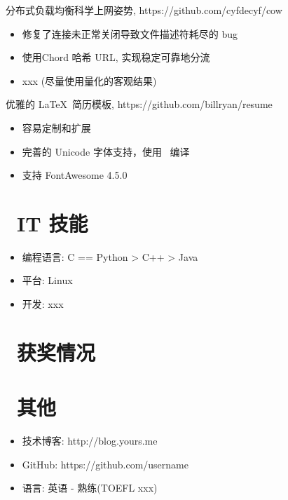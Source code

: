 \documentclass{resume}
\begin{document}
\begin{onehalfspacing}
  分布式负载均衡科学上网姿势, https://github.com/cyfdecyf/cow
  \begin{itemize}
    \item 修复了连接未正常关闭导致文件描述符耗尽的 bug
    \item 使用Chord 哈希 URL, 实现稳定可靠地分流
    \item xxx (尽量使用量化的客观结果)
  \end{itemize}
\end{onehalfspacing}

\begin{onehalfspacing}
  优雅的 \LaTeX\ 简历模板, https://github.com/billryan/resume
  \begin{itemize}
    \item 容易定制和扩展
    \item 完善的 Unicode 字体支持，使用 \XeLaTeX\ 编译
    \item 支持 FontAwesome 4.5.0
  \end{itemize}
\end{onehalfspacing}


\section{\faCogs\ IT 技能}
\begin{itemize}[parsep=0.5ex]
  \item 编程语言: C == Python > C++ > Java
  \item 平台: Linux
  \item 开发: xxx
\end{itemize}

\section{\faHeartO\ 获奖情况}

\section{\faInfo\ 其他}
\begin{itemize}[parsep=0.5ex]
  \item 技术博客: http://blog.yours.me
  \item GitHub: https://github.com/username
  \item 语言: 英语 - 熟练(TOEFL xxx)
\end{itemize}

%
%
\end{document}
